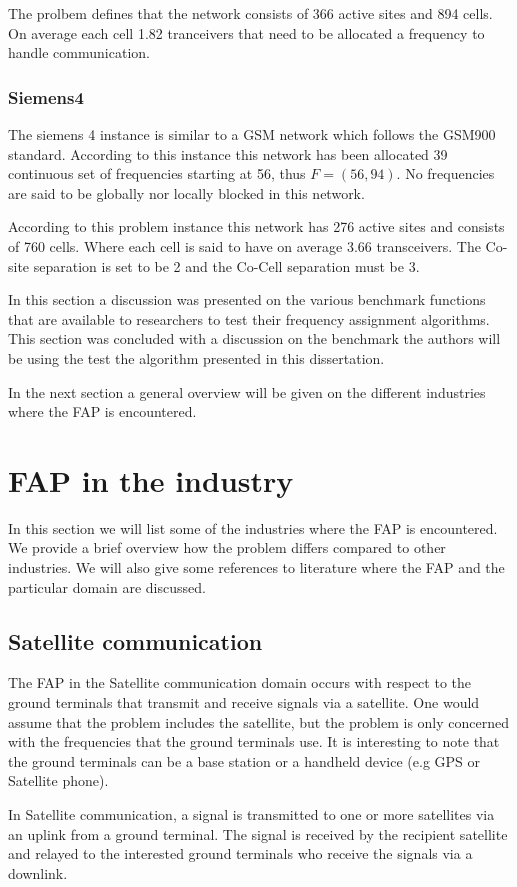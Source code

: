 The prolbem defines that the network consists of 366 active sites and 894 cells. On average each cell 1.82 tranceivers that need to be allocated a frequency to handle communication.
\subsubsection{Siemens4}
The siemens 4 instance is similar to a GSM network which follows the GSM900 standard. According to this instance this network has been allocated 39 continuous set of frequencies starting at 56, thus $F = (56,94)$. No frequencies are said to be globally nor locally blocked in this network.

According to this problem instance this network has 276 active sites and consists of 760 cells. Where each cell is said to have on average 3.66 transceivers. The Co-site separation is set to be 2 and the Co-Cell separation must be 3.

In this section a discussion was presented on the various benchmark functions that are available to researchers to test their frequency assignment algorithms. This section was concluded with a discussion on the benchmark the authors will be using the test the algorithm presented in this dissertation.

In the next section a general overview will be given on the different industries where the FAP is encountered.
\section{FAP in the industry}
\label{sec:FAPIndustry}
In this section we will list some of the industries where the FAP is encountered. We provide a brief overview how the problem differs compared to other industries. We will also give some references to literature where the FAP and the particular domain are discussed. 

\subsection{Satellite communication}
The FAP in the Satellite communication domain occurs with respect to the ground terminals that transmit and receive signals via a satellite. One would assume that the problem includes the satellite, but the problem is only concerned with the frequencies that the ground terminals use. It is interesting to note that the ground terminals can be a base station or a handheld device (e.g GPS or Satellite phone).

In Satellite communication, a signal is transmitted to one or more satellites via an uplink from a ground terminal. The signal is received by the recipient satellite and relayed to the interested ground terminals who receive the signals via a downlink.

